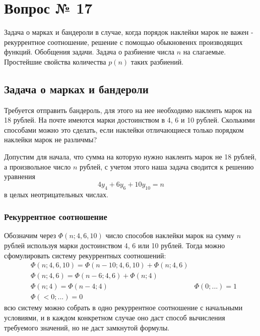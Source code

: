 \chapter{Вопрос № 17}

Задача о марках и бандероли в случае, когда порядок наклейки марок не важен - рекуррентное соотношение, решение с помощью обыкновеннх производящих функций. Обобщения задачи. Задача о разбиение числа $n$ на слагаемые. Простейшие свойства количества $p\left(n\right)$ таких разбиений.

\section{Задача о марках и бандероли}

Требуется отправить бандероль, для этого на нее необходимо наклеить марок на 18 рублей. На почте имеются марки достоинством в 4, 6 и 10 рублей. Сколькими способами можно это сделать, если наклейки отличающиеся только порядком наклейки марок не различмы?

Допустим для начала, что сумма на которую нужно наклеить марок не 18 рублей, а произвольное число $n$ рублей, с учетом этого наша задача сводится к решению уравнения $$ 4 y_4 + 6 y_6 + 10 y_{10} = n $$ в целых неотрицательных числах.

\subsection{Рекуррентное соотношение}

Обозначим через $\Phi\left(n;4,6,10\right)$ число способов наклейки марок на сумму $n$ рублей используя марки достоинством 4, 6 или 10 рублей. Тогда можно сфомулировать систему рекуррентных соотношений:
\begin{equation}
	\begin{split}
		& \Phi\left(n;4,6,10\right) = \Phi\left(n-10;4,6,10\right) + \Phi\left(n;4,6\right) \\
		& \Phi\left(n;4,6\right) = \Phi\left(n-6;4,6\right) + \Phi\left(n;4\right) \\
		& \Phi\left(n;4\right) = \Phi\left(n-4;4\right)
		& \Phi\left(0;...\right) = 1 \\
		& \Phi\left(<0; ...\right) = 0
	\end{split}
\end{equation}
всю систему можно собрать в одно рекуррентное соотношение с начальными условиями, и в каждом конкретном случае оно даст способ вычисления требуемого значений, но не даст замкнутой формулы.

